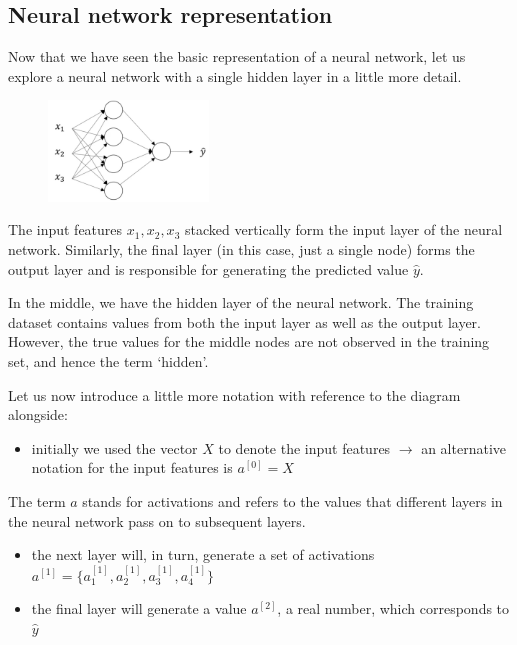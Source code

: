 \documentclass{article}[a4paper,12pt]
\theoremstyle{definition}
\begin{document}
\subsection{Neural network representation}
Now that we have seen the basic representation of a neural network, let us explore a neural network with a single hidden layer in a little more detail. 
\begin{figure}
\centering \includegraphics[width=0.38\textwidth]{single_hidden_layer.png}
\end{figure}
\vspace{6pt}

The input features $x_1,x_2,x_3$ stacked vertically form the input layer of the neural network. Similarly, the final layer (in this case, just a single node) forms the output layer and is responsible for generating the predicted value $\hat{y}$. 
\vspace{6pt}

In the middle, we have the hidden layer of the neural network. The training dataset contains values from both the input layer as well as the output layer. However, the true values for the middle nodes are not observed in the training set, and hence the term `hidden'.
\vspace{6pt}

Let us now introduce a little more notation with reference to the diagram alongside:
\begin{itemize}
	\item initially we used the vector $X$ to denote the input features $\rightarrow$ an alternative notation for the input features is $a^{[0]}=X$
\end{itemize}
The term $a$ stands for activations and refers to the values that different layers in the neural network pass on to subsequent layers.
\begin{itemize}
	\item the next layer will, in turn, generate a set of activations $a^{[1]}=\{a_1^{[1]},a_2^{[1]},a_3^{[1]},a_4^{[1]}\}$
	\item the final layer will generate a value $a^{[2]}$, a real number, which corresponds to $\hat{y}$
\end{itemize}
\end{document}
